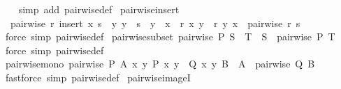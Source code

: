 \begin{isabellebody}
%
\isadelimproof
\ \ %
\endisadelimproof
%
\isatagproof
{}\isamarkupfalse%
\ {\isacharparenleft}{\kern0pt}simp\ add{\isacharcolon}{\kern0pt}\ pairwise{\isacharunderscore}{\kern0pt}def{\isacharparenright}{\kern0pt}%
\endisatagproof
{\isafoldproof}%
%
\isadelimproof
\isanewline
%
\endisadelimproof
\isanewline
{}\isamarkupfalse%
\ pairwise{\isacharunderscore}{\kern0pt}insert{\isacharcolon}{\kern0pt}\isanewline
\ \ {\isachardoublequoteopen}pairwise\ r\ {\isacharparenleft}{\kern0pt}insert\ x\ s{\isacharparenright}{\kern0pt}\ {\isasymlongleftrightarrow}\ {\isacharparenleft}{\kern0pt}{\isasymforall}y{\isachardot}{\kern0pt}\ y\ {\isasymin}\ s\ {\isasymand}\ y\ {\isasymnoteq}\ x\ {\isasymlongrightarrow}\ r\ x\ y\ {\isasymand}\ r\ y\ x{\isacharparenright}{\kern0pt}\ {\isasymand}\ pairwise\ r\ s{\isachardoublequoteclose}\isanewline
%
\isadelimproof
\ \ %
\endisadelimproof
%
\isatagproof
{}\isamarkupfalse%
\ {\isacharparenleft}{\kern0pt}force\ simp{\isacharcolon}{\kern0pt}\ pairwise{\isacharunderscore}{\kern0pt}def{\isacharparenright}{\kern0pt}%
\endisatagproof
{\isafoldproof}%
%
\isadelimproof
\isanewline
%
\endisadelimproof
\isanewline
{}\isamarkupfalse%
\ pairwise{\isacharunderscore}{\kern0pt}subset{\isacharcolon}{\kern0pt}\ {\isachardoublequoteopen}pairwise\ P\ S\ {\isasymLongrightarrow}\ T\ {\isasymsubseteq}\ S\ {\isasymLongrightarrow}\ pairwise\ P\ T{\isachardoublequoteclose}\isanewline
%
\isadelimproof
\ \ %
\endisadelimproof
%
\isatagproof
{}\isamarkupfalse%
\ {\isacharparenleft}{\kern0pt}force\ simp{\isacharcolon}{\kern0pt}\ pairwise{\isacharunderscore}{\kern0pt}def{\isacharparenright}{\kern0pt}%
\endisatagproof
{\isafoldproof}%
%
\isadelimproof
\isanewline
%
\endisadelimproof
\isanewline
{}\isamarkupfalse%
\ pairwise{\isacharunderscore}{\kern0pt}mono{\isacharcolon}{\kern0pt}\ {\isachardoublequoteopen}{\isasymlbrakk}pairwise\ P\ A{\isacharsemicolon}{\kern0pt}\ {\isasymAnd}x\ y{\isachardot}{\kern0pt}\ P\ x\ y\ {\isasymLongrightarrow}\ Q\ x\ y{\isacharsemicolon}{\kern0pt}\ B\ {\isasymsubseteq}\ A{\isasymrbrakk}\ {\isasymLongrightarrow}\ pairwise\ Q\ B{\isachardoublequoteclose}\isanewline
%
\isadelimproof
\ \ %
\endisadelimproof
%
\isatagproof
{}\isamarkupfalse%
\ {\isacharparenleft}{\kern0pt}fastforce\ simp{\isacharcolon}{\kern0pt}\ pairwise{\isacharunderscore}{\kern0pt}def{\isacharparenright}{\kern0pt}%
\endisatagproof
{\isafoldproof}%
%
\isadelimproof
\isanewline
%
\endisadelimproof
\isanewline
{}\isamarkupfalse%
\ pairwise{\isacharunderscore}{\kern0pt}imageI{\isacharcolon}{\kern0pt}\isanewline

\end{isabellebody}
